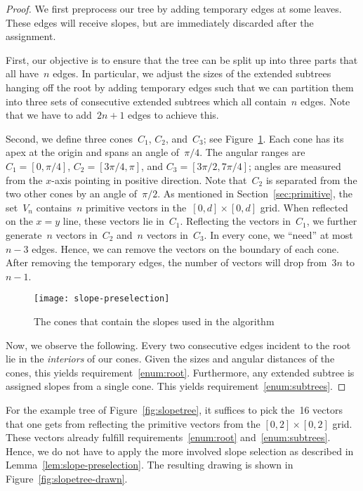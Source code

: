 \documentclass[a4paper,11pt]{article}
\theoremstyle{plain}
\begin{document}
\begin{proof}
	We first preprocess our tree by adding temporary edges at some
	leaves. These edges will receive slopes, but are immediately discarded
	after the assignment.

	First, our objective is to ensure that the tree can be split up into three 
	parts that all have~$n$ edges. In particular, we adjust the sizes of the 
	extended subtrees hanging off the root by adding temporary edges such that we 
	can partition them into three sets of consecutive extended subtrees which all 
	contain~$n$ edges.  Note that we have to add~$2n+1$ edges to achieve this.

	Second, we define three cones~$C_1$, $C_2$, and~$C_3$; see 
	Figure~\ref{fig:slope-preselection}.  Each cone
	has its apex at the origin and spans an angle of~$\pi/4$.  The angular
	ranges are~$C_1=[0,\pi/4]$, $C_2=[3\pi/4,\pi]$, and $C_3=[3\pi/2,7\pi/4]$; 
	angles are measured from the $x$-axis pointing
	in positive direction.  Note that~$C_2$ is separated from the two
	other cones by an angle of~$\pi/2$.  As mentioned in
	Section~\ref{sec:primitive}, the set~$V_n$ contains~$n$ primitive
	vectors in the~$[0,d]\times[0,d]$ grid. 
	When reflected on the $x=y$ line, these vectors lie in~$C_1$. 
	Reflecting the vectors in~$C_1$, we further generate~$n$ vectors
	in~$C_2$ and~$n$ vectors in~$C_3$.  In every cone, we ``need'' at most~$n-3$ 
	edges. Hence, we can remove the vectors on the boundary of each cone.
	After removing the temporary edges, the number of vectors will drop from~$3n$ 
	to~$n-1$. 

	\begin{figure}[t]
		\centering
		\texttt{[image: slope-preselection]}
		\caption{The cones that contain the slopes used in the algorithm}  
		\label{fig:slope-preselection}
	\end{figure}

	Now, we observe the following.  Every two consecutive edges incident to
	the root lie in the \emph{interiors} of our cones.  Given the sizes and angular 
	distances of the cones, this yields requirement~\ref{enum:root}.  
	Furthermore, any extended subtree is assigned slopes
	from a single cone.  This yields requirement~\ref{enum:subtrees}.
\end{proof}

For the example tree of Figure~\ref{fig:slopetree}, it suffices to pick
the~16 vectors that one gets from reflecting the primitive vectors
from the $[0,2] \times [0,2]$ grid.  These vectors already fulfill
requirements~\ref{enum:root} and~\ref{enum:subtrees}.  Hence, we
do not have to apply the more involved slope selection as described
in Lemma~\ref{lem:slope-preselection}.  The resulting drawing is shown
in Figure~\ref{fig:slopetree-drawn}.
\end{document}
